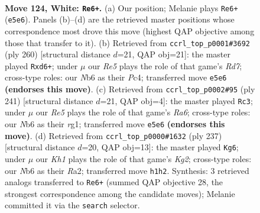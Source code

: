 \documentclass[11pt]{article}
\begin{document}
\clearpage

\begin{figure}[p]\centering
\begin{subfigure}{0.46\textwidth}\centering
\resizebox{\linewidth}{!}{%
\newchessgame
\chessboard[
  setfen={7r/6p1/1N4k1/4Rp1p/7P/6P1/8/7K w - - 6 124},
  showmover=false,
  pgfstyle=straightmove, color=movearrow, markmove={e5-e6}
]}
\caption{}
\end{subfigure}\hfill
\begin{subfigure}{0.46\textwidth}\centering
\resizebox{\linewidth}{!}{%
\newchessgame
\chessboard[
  setfen={8/3R4/3p3k/2p2rpp/P1P5/1P5K/8/8 w - - 0 131},
  showmover=false,
  pgfstyle=straightmove, color=movearrow, markmove={d7-d6}
]}
\caption{}
\end{subfigure}
\\[4pt]
\begin{subfigure}{0.46\textwidth}\centering
\resizebox{\linewidth}{!}{%
\newchessgame
\chessboard[
  setfen={5k2/5p2/4pP2/4P3/4PK2/r7/8/6R1 b - - 58 121},
  showmover=false,
  pgfstyle=straightmove, color=movearrow, markmove={a3-c3}
]}
\caption{}
\end{subfigure}\hfill
\begin{subfigure}{0.46\textwidth}\centering
\resizebox{\linewidth}{!}{%
\newchessgame
\chessboard[
  setfen={8/6k1/8/3R1p1p/5P1P/6PK/r7/8 b - - 84 119},
  showmover=false,
  pgfstyle=straightmove, color=movearrow, markmove={g7-g6}
]}
\caption{}
\end{subfigure}
\caption{\textbf{Move 124, White: \texttt{Re6+}.} (a) Our position; Melanie plays \texttt{Re6+} (\texttt{e5e6}). Panels (b)--(d) are the retrieved master positions whose correspondence most drove this move (highest QAP objective among those that transfer to it). (b) Retrieved from \texttt{ccrl\_top\_p0001\#3692} (ply 260) [structural distance $d$=21, QAP obj=21]: the master played \texttt{Rxd6+}; under $\mu$ our \emph{Re5} plays the role of that game's \emph{Rd7}; cross-type roles: our \emph{N}b6 as their \emph{P}c4; transferred move \texttt{e5e6} \textbf{(endorses this move)}. (c) Retrieved from \texttt{ccrl\_top\_p0002\#95} (ply 241) [structural distance $d$=21, QAP obj=4]: the master played \texttt{Rc3}; under $\mu$ our \emph{Re5} plays the role of that game's \emph{Ra6}; cross-type roles: our \emph{N}b6 as their \emph{r}g1; transferred move \texttt{e5e6} \textbf{(endorses this move)}. (d) Retrieved from \texttt{ccrl\_top\_p0000\#1632} (ply 237) [structural distance $d$=20, QAP obj=13]: the master played \texttt{Kg6}; under $\mu$ our \emph{Kh1} plays the role of that game's \emph{Kg2}; cross-type roles: our \emph{N}b6 as their \emph{R}a2; transferred move \texttt{h1h2}. Synthesis: 3 retrieved analogs transferred to \texttt{Re6+} (summed QAP objective 28, the strongest correspondence among the candidate moves); Melanie committed it via the \texttt{search} selector.}
\label{fig:thought-m246}
\end{figure}
\end{document}
